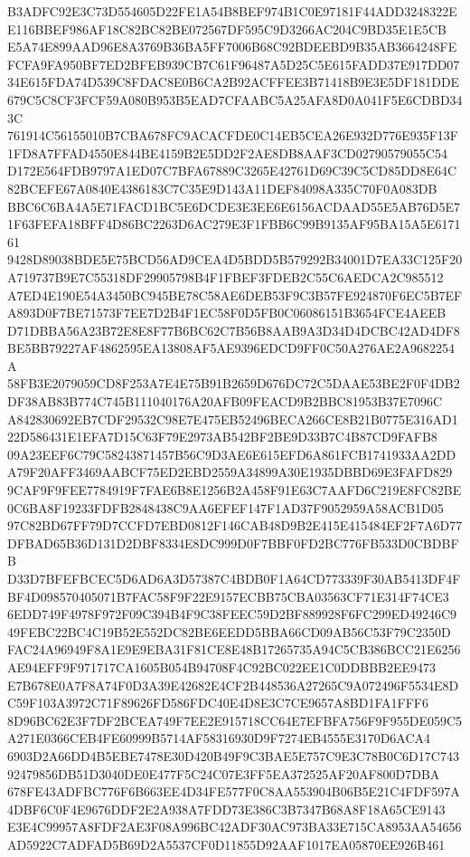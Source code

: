 \documentclass[UTF8,fontset=fandol,zihao=-4,a4paper]{ctexart}
\begin{document}
{{B3ADFC92E3C73D554605D22FE1A54B8BEF974B1C0E97181F44ADD3248322EE116BBEF986AF18C82BC82BE072567DF595C9D3266AC204C9BD35E1E5CB
E5A74E899AAD96E8A3769B36BA5FF7006B68C92BDEEBD9B35AB3664248FEFCFA9FA950BF7ED2BFEB939CB7C61F96487A5D25C5E615FADD37E917DD07
34E615FDA74D539C8FDAC8E0B6CA2B92ACFFEE3B71418B9E3E5DF181DDE679C5C8CF3FCF59A080B953B5EAD7CFAABC5A25AFA8D0A041F5E6CDBD343C
761914C56155010B7CBA678FC9ACACFDE0C14EB5CEA26E932D776E935F13F1FD8A7FFAD4550E844BE4159B2E5DD2F2AE8DB8AAF3CD02790579055C54
D172E564FDB9797A1ED07C7BFA67889C3265E42761D69C39C5CD85DD8E64C82BCEFE67A0840E4386183C7C35E9D143A11DEF84098A335C70F0A083DB
BBC6C6BA4A5E71FACD1BC5E6DCDE3E3EE6E6156ACDAAD55E5AB76D5E71F63FEFA18BFF4D86BC2263D6AC279E3F1FBB6C99B9135AF95BA15A5E617161
9428D89038BDE5E75BCD56AD9CEA4D5BDD5B579292B34001D7EA33C125F20A719737B9E7C55318DF29905798B4F1FBEF3FDEB2C55C6AEDCA2C985512
A7ED4E190E54A3450BC945BE78C58AE6DEB53F9C3B57FE924870F6EC5B7EFA893D0F7BE71573F7EE7D2B4F1EC58F0D5FB0C06086151B3654FCE4AEEB
D71DBBA56A23B72E8E8F77B6BC62C7B56B8AAB9A3D34D4DCBC42AD4DF8BE5BB79227AF4862595EA13808AF5AE9396EDCD9FF0C50A276AE2A9682254A
58FB3E2079059CD8F253A7E4E75B91B2659D676DC72C5DAAE53BE2F0F4DB2DF38AB83B774C745B111040176A20AFB09FEACD9B2BBC81953B37E7096C
A842830692EB7CDF29532C98E7E475EB52496BECA266CE8B21B0775E316AD122D586431E1EFA7D15C63F79E2973AB542BF2BE9D33B7C4B87CD9FAFB8
09A23EEF6C79C58243871457B56C9D3AE6E615EFD6A861FCB1741933AA2DDA79F20AFF3469AABCF75ED2EBD2559A34899A30E1935DBBD69E3FAFD829
9CAF9F9FEE7784919F7FAE6B8E1256B2A458F91E63C7AAFD6C219E8FC82BE0C6BA8F19233FDFB2848438C9AA6EFEF147F1AD37F9052959A58ACB1D05
97C82BD67FF79D7CCFD7EBD0812F146CAB48D9B2E415E415484EF2F7A6D77DFBAD65B36D131D2DBF8334E8DC999D0F7BBF0FD2BC776FB533D0CBDBFB
D33D7BFEFBCEC5D6AD6A3D57387C4BDB0F1A64CD773339F30AB5413DF4FBF4D098570405071B7FAC58F9F22E9157ECBB75CBA03563CF71E314F74CE3
6EDD749F4978F972F09C394B4F9C38FEEC59D2BF889928F6FC299ED49246C949FEBC22BC4C19B52E552DC82BE6EEDD5BBA66CD09AB56C53F79C2350D
FAC24A96949F8A1E9E9EBA31F81CE8E48B17265735A94C5CB386BCC21E6256AE94EFF9F971717CA1605B054B94708F4C92BC022EE1C0DDBBB2EE9473
E7B678E0A7F8A74F0D3A39E42682E4CF2B448536A27265C9A072496F5534E8DC59F103A3972C71F89626FD586FDC40E4D8E3C7CE9657A8BD1FA1FFF6
8D96BC62E3F7DF2BCEA749F7EE2E915718CC64E7EFBFA756F9F955DE059C5A271E0366CEB4FE60999B5714AF58316930D9F7274EB4555E3170D6ACA4
6903D2A66DD4B5EBE7478E30D420B49F9C3BAE5E757C9E3C78B0C6D17C74392479856DB51D3040DE0E477F5C24C07E3FF5EA372525AF20AF800D7DBA
678FE43ADFBC776F6B663EE4D34FE577F0C8AA553904B06B5E21C4FDF597A4DBF6C0F4E9676DDF2E2A938A7FDD73E386C3B7347B68A8F18A65CE9143
E3E4C99957A8FDF2AE3F08A996BC42ADF30AC973BA33E715CA8953AA54656AD5922C7ADFAD5B69D2A5537CF0D11855D92AAF1017EA05870EE926B461
}}
\end{document}
